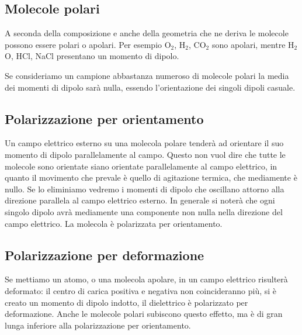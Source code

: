 \subsection{Molecole polari}
A seconda della composizione e anche della geometria che ne deriva le molecole possono essere polari o apolari. Per esempio O$_2$, H$_2$, CO$_2$ sono apolari, mentre H$_2$O, HCl, NaCl presentano un momento di dipolo.

Se consideriamo un campione abbastanza numeroso di molecole polari la media dei momenti di dipolo sarà nulla, essendo l'orientazione dei singoli dipoli casuale.
\subsection{Polarizzazione per orientamento}
Un campo elettrico esterno su una molecola polare tenderà ad orientare il suo momento di dipolo parallelamente al campo. Questo non vuol dire che tutte le molecole sono orientate siano orientate parallelamente al campo elettrico, in quanto il movimento che prevale è quello di agitazione termica, che mediamente è nullo. Se lo eliminiamo vedremo i momenti di dipolo che oscillano attorno alla direzione parallela al campo elettrico esterno. In generale si noterà che ogni singolo dipolo avrà mediamente una componente non nulla nella direzione del campo elettrico. La molecola è polarizzata per orientamento.
\subsection{Polarizzazione per deformazione}
Se mettiamo un atomo, o una molecola apolare, in un campo elettrico risulterà deformato: il centro di carica positiva e negativa non coincideranno più, si è creato un momento di dipolo indotto, il dielettrico è polarizzato per deformazione. Anche le molecole polari subiscono questo effetto, ma è di gran lunga inferiore alla polarizzazione per orientamento.
